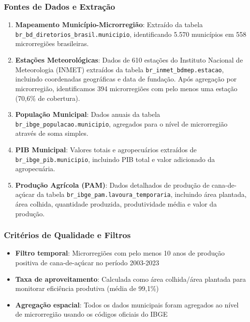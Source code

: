 \documentclass[
	12pt,				%
	oneside,			%
	a4paper,			%
	english,			%
	french,				%
	spanish,			%
	brazil				%
	]{abntex2}
\begin{document}
\subsubsection{Fontes de Dados e Extração}

\begin{enumerate}
\item \textbf{Mapeamento Município-Microrregião}: Extraído da tabela\\
\texttt{\small br\_bd\_diretorios\_brasil.municipio}, identificando 5.570 municípios em 558 microrregiões brasileiras.

\item \textbf{Estações Meteorológicas}: Dados de 610 estações do Instituto Nacional de Meteorologia (INMET) extraídos da tabela \texttt{\small br\_inmet\_bdmep.estacao}, incluindo coordenadas geográficas e data de fundação. Após agregação por microrregião, identificamos 394 microrregiões com pelo menos uma estação (70,6\% de cobertura).

\item \textbf{População Municipal}: Dados anuais da tabela \texttt{\small br\_ibge\_populacao.municipio}, agregados para o nível de microrregião através de soma simples.

\item \textbf{PIB Municipal}: Valores totais e agropecuários extraídos de\\
\texttt{\small br\_ibge\_pib.municipio}, incluindo PIB total e valor adicionado da agropecuária.

\item \textbf{Produção Agrícola (PAM)}: Dados detalhados de produção de cana-de-açúcar da tabela \texttt{\small br\_ibge\_pam.lavoura\_temporaria}, incluindo área plantada, área colhida, quantidade produzida, produtividade média e valor da produção.
\end{enumerate}

\subsubsection{Critérios de Qualidade e Filtros}

\begin{itemize}
\item \textbf{Filtro temporal}: Microrregiões com pelo menos 10 anos de produção positiva de cana-de-açúcar no período 2003-2023
\item \textbf{Taxa de aproveitamento}: Calculada como área colhida/área plantada para monitorar eficiência produtiva (média de 99,1\%)
\item \textbf{Agregação espacial}: Todos os dados municipais foram agregados ao nível de microrregião usando os códigos oficiais do IBGE
\end{itemize}
\end{document}
